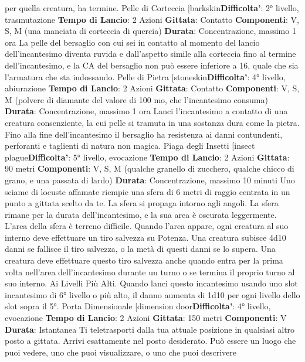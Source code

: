 \begin{multicols}{2}
per quella creatura, ha termine.
Pelle di Corteccia
[barkskin\textbf{Difficolta'}:
2° livello, trasmutazione
\textbf{Tempo di Lancio}: 2 Azioni
\textbf{Gittata}: Contatto
\textbf{Componenti}: V, S, M (una manciata di corteccia di
quercia)
\textbf{Durata}: Concentrazione, massimo 1 ora
La pelle del bersaglio con cui sei in contatto al
momento del lancio dell’incantesimo diventa ruvida e
dall’aspetto simile alla corteccia fino al termine
dell’incantesimo, e la CA del bersaglio non può essere
inferiore a 16, quale che sia l’armatura che sta
indossando.
Pelle di Pietra
[stoneskin\textbf{Difficolta'}:
4° livello, abiurazione
\textbf{Tempo di Lancio}: 2 Azioni
\textbf{Gittata}: Contatto
\textbf{Componenti}: V, S, M (polvere di diamante del valore di
100 mo, che l’incantesimo consuma)
\textbf{Durata}: Concentrazione, massimo 1 ora
Lanci l’incantesimo a contatto di una creatura
consenziente, la cui pelle si tramuta in una sostanza
dura come la pietra. Fino alla fine dell’incantesimo il
bersaglio ha resistenza ai danni contundenti, perforanti
e taglienti di natura non magica.
Piaga degli Insetti
[insect plague\textbf{Difficolta'}:
5° livello, evocazione
\textbf{Tempo di Lancio}: 2 Azioni
\textbf{Gittata}: 90 metri
\textbf{Componenti}: V, S, M (qualche granello di zucchero,
qualche chicco di grano, e una passata di lardo)
\textbf{Durata}: Concentrazione, massimo 10 minuti
Uno sciame di locuste affamate riempie una sfera di 6
metri di raggio centrata in un punto a gittata scelto da
te. La sfera si propaga intorno agli angoli. La sfera
rimane per la durata dell’incantesimo, e la sua area è
oscurata leggermente. L’area della sfera è terreno
difficile.
Quando l’area appare, ogni creatura al suo interno deve
effettuare un tiro salvezza su Potenza. Una
creatura subisce 4d10 danni se fallisce il tiro
salvezza, o la metà di questi danni se lo supera. Una
creatura deve effettuare questo tiro salvezza anche
quando entra per la prima volta nell’area
dell’incantesimo durante un turno o se termina il proprio
turno al suo interno.
Ai Livelli Più Alti. Quando lanci questo incantesimo
usando uno slot incantesimo di 6° livello o più alto, il
danno aumenta di 1d10 per ogni livello dello slot sopra
il 5°.
Porta Dimensionale
[dimension door\textbf{Difficolta'}:
4° livello, evocazione
\textbf{Tempo di Lancio}: 2 Azioni
\textbf{Gittata}: 150 metri
\textbf{Componenti}: V
\textbf{Durata}: Istantanea
Ti teletrasporti dalla tua attuale posizione in qualsiasi
altro posto a gittata. Arrivi esattamente nel posto
desiderato. Può essere un luogo che puoi vedere, uno
che puoi visualizzare, o uno che puoi descrivere

\end{multicols}
